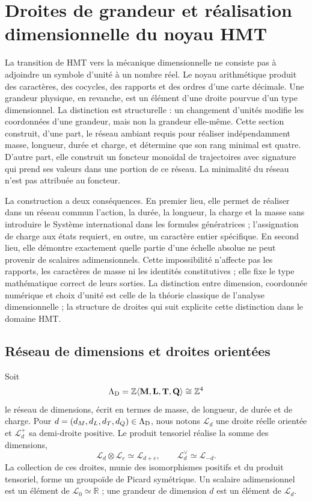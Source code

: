 
\chapter{Droites de grandeur et réalisation dimensionnelle du noyau HMT}
\label{chap:funtor-dimensional-hmt}

La transition de HMT vers la mécanique dimensionnelle ne consiste pas à adjoindre
un symbole d'unité à un nombre réel. Le noyau arithmétique produit des
caractères, des cocycles, des rapports et des ordres d'une carte décimale. Une grandeur
physique, en revanche, est un élément d'une droite pourvue d'un type dimensionnel.
La distinction est structurelle : un changement d'unités modifie les coordonnées
d'une grandeur, mais non la grandeur elle-même. Cette section construit, d'une
part, le réseau ambiant requis pour réaliser indépendamment
masse, longueur, durée et charge, et détermine que son rang minimal est quatre.
D'autre part, elle construit un foncteur monoïdal de trajectoires avec signature qui
prend ses valeurs dans une portion de ce réseau. La minimalité du réseau n'est pas
attribuée au foncteur.

La construction a deux conséquences. En premier lieu, elle permet de réaliser
dans un réseau commun l'action, la durée, la longueur, la charge et la masse
sans introduire le Système international dans les formules génératrices ;
l'assignation de charge aux états requiert, en outre, un caractère entier
spécifique. En second lieu, elle démontre exactement quelle partie d'une échelle
absolue ne peut provenir de scalaires adimensionnels. Cette impossibilité
n'affecte pas les rapports, les caractères de masse ni les identités
constitutives ; elle fixe le type mathématique correct de leurs sorties.
La distinction entre dimension, coordonnée numérique et choix d'unité est celle
de la théorie classique de l'analyse dimensionnelle \cite{Buckingham1914,Bridgman1931} ;
la structure de droites qui suit explicite cette distinction dans le domaine
HMT\@.

\section{Réseau de dimensions et droites orientées}

Soit
\[
 \Lambda_{\rm D}
 =\mathbb Z\langle \mathbf M,\mathbf L,\mathbf T,\mathbf Q\rangle
 \cong\mathbb Z^4
\]
le réseau de dimensions, écrit en termes de masse, de longueur, de durée
et de charge. Pour
\(d=(d_M,d_L,d_T,d_Q)\in\Lambda_{\rm D}\), nous notons
\(\mathcal L_d\) une droite réelle orientée et
\(\mathcal L_d^+\) sa demi-droite positive. Le produit tensoriel réalise la
somme des dimensions,
\[
 \mathcal L_d\otimes\mathcal L_e\simeq\mathcal L_{d+e},
 \qquad
 \mathcal L_d^\vee\simeq\mathcal L_{-d}.
\]
La collection de ces droites, munie des isomorphismes positifs et du produit
tensoriel, forme un groupoïde de Picard symétrique. Un scalaire adimensionnel est
un élément de \(\mathcal L_0\simeq\mathbb R\) ; une grandeur de dimension
\(d\) est un élément de \(\mathcal L_d\).

